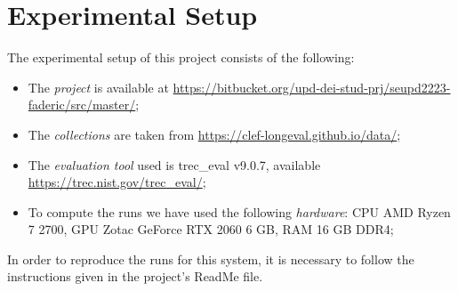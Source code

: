 \section{Experimental Setup}
\label{sec:setup}

The experimental setup of this project consists of the following:
\begin{itemize}
    \item The \emph{project} is available at \url{https://bitbucket.org/upd-dei-stud-prj/seupd2223-faderic/src/master/};
    \item The \emph{collections} are taken from \url{https://clef-longeval.github.io/data/};
    \item The \emph{evaluation tool} used is trec\_eval v9.0.7, available \url{https://trec.nist.gov/trec_eval/};
    \item To compute the runs we have used the following \emph{hardware}: CPU AMD Ryzen 7 2700, GPU Zotac GeForce RTX 2060 6 GB, RAM 16 GB DDR4;
\end{itemize}

In order to reproduce the runs for this system, it is necessary to follow the instructions given in the project's ReadMe file.